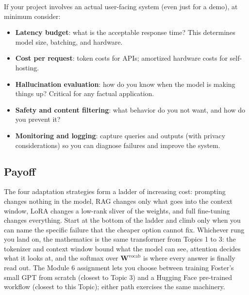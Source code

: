 \documentclass[11pt]{article}
\theoremstyle{remark}
\begin{document}
If your project involves an actual user-facing system (even just for a demo), at minimum consider:
\begin{itemize}[noitemsep]
    \item \textbf{Latency budget}: what is the acceptable response time? This determines model size, batching, and hardware.
    \item \textbf{Cost per request}: token costs for APIs; amortized hardware costs for self-hosting.
    \item \textbf{Hallucination evaluation}: how do you know when the model is making things up? Critical for any factual application.
    \item \textbf{Safety and content filtering}: what behavior do you not want, and how do you prevent it?
    \item \textbf{Monitoring and logging}: capture queries and outputs (with privacy considerations) so you can diagnose failures and improve the system.
\end{itemize}

\subsection{Payoff}

The four adaptation strategies form a ladder of increasing cost: prompting changes nothing in the model, RAG changes only what goes into the context window, LoRA changes a low-rank sliver of the weights, and full fine-tuning changes everything. Start at the bottom of the ladder and climb only when you can name the specific failure that the cheaper option cannot fix. Whichever rung you land on, the mathematics is the same transformer from Topics 1 to 3: the tokenizer and context window bound what the model can see, attention decides what it looks at, and the softmax over \(\mathbf{W}^{\text{vocab}}\) is where every answer is finally read out. The Module 6 assignment lets you choose between training Foster's small GPT from scratch (closest to Topic 3) and a Hugging Face pre-trained workflow (closest to this Topic); either path exercises the same machinery.
\end{document}
